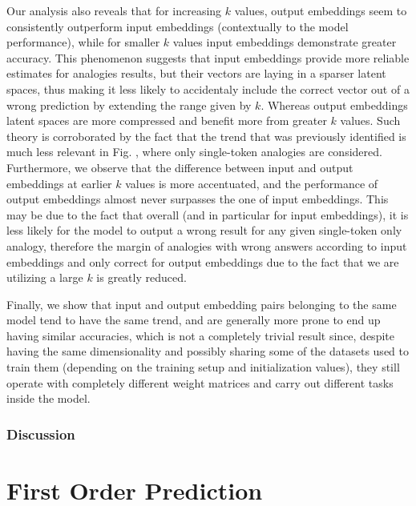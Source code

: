 {Our analysis also reveals that for increasing $k$ values, output embeddings seem to consistently outperform input embeddings (contextually to the model performance), while for smaller $k$ values input embeddings demonstrate greater accuracy.
This phenomenon suggests that input embeddings provide more reliable estimates for analogies results, but their vectors are laying in a sparser latent spaces, thus making it less likely to accidentaly include the correct vector out of a wrong prediction by extending the range given by $k$.
Whereas output embeddings latent spaces are more compressed and benefit more from greater $k$ values.
Such theory is corroborated by the fact that the trend that was previously identified is much less relevant in Fig. 
, where only single-token analogies are considered.
Furthermore, we observe that the difference between input and output embeddings at earlier $k$ values is more accentuated, and the performance of output embeddings almost never surpasses the one of input embeddings.
This may be due to the fact that overall (and in particular for input embeddings), it is less likely for the model to output a wrong result for any given single-token only analogy, therefore the margin of analogies with wrong answers according to input embeddings and only correct for output embeddings due to the fact that we are utilizing a large $k$ is greatly reduced.

Finally, we show that input and output embedding pairs belonging to the same model tend to have the same trend, and are generally more prone to end up having similar accuracies, which is not a completely trivial result since, despite having the same dimensionality and possibly sharing some of the datasets used to train them (depending on the training setup and initialization values), they still operate with completely different weight matrices and carry out different tasks inside the model.
}

\subsubsection{Discussion}



\section{First Order Prediction}

